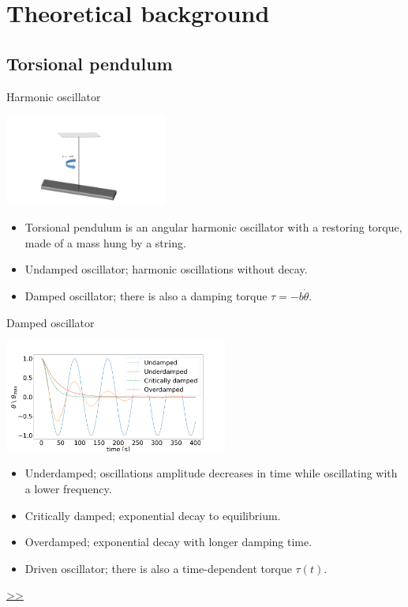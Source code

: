 \documentclass{beamer}
\begin{document}
\section{Theoretical background}
\subsection{Torsional pendulum}
\begin{frame}{Harmonic oscillator}
	\begin{center}		
		\includegraphics[width=0.4\textwidth,keepaspectratio]{torsion_pendulum_powerpoint.jpg}
    \end{center}
	\begin{itemize}

		\item Torsional pendulum is an angular harmonic oscillator with a restoring torque, made of a mass hung by a string. 
		\item Undamped oscillator; harmonic oscillations without decay.
		\item Damped oscillator; there is also a damping torque $\tau = -b\dot{\theta}$.
		
	\end{itemize}
\end{frame}
\begin{frame}{Damped oscillator}
	\begin{center}		
		\includegraphics[width=0.55\textwidth,keepaspectratio]{damp.png}
    \end{center}
	\begin{itemize}
		
		\item Underdamped; oscillations amplitude decreases in time while oscillating with a lower frequency.
		\item Critically damped; exponential decay to equilibrium.
		\item Overdamped; exponential decay with longer damping time. 
		\pause
		\item Driven oscillator; there is also a time-dependent torque $\tau(t)$.
	\end{itemize}
	\hyperlink{frame:Gravitational field}{>>} 
\end{frame}
\end{document}
